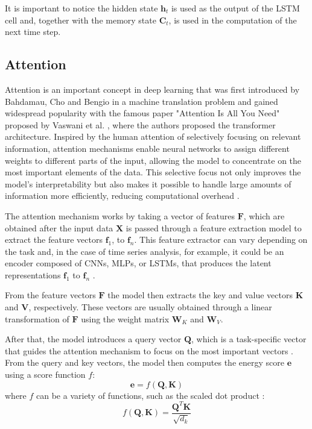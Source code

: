 It is important to notice the hidden state $\boldsymbol{h}_t$ is used as the output of the LSTM cell and, together with the memory state $\boldsymbol{C}_t$, is used in the computation of the next time step.

\subsection{Attention} \label{sec-attention}

Attention is an important concept in deep learning that was first introduced by Bahdamau, Cho and Bengio \cite{bahdanau2016neuralmachinetranslationjointly} in a machine translation problem and gained widespread popularity with the famous paper "Attention Is All You Need" proposed by Vaswani et al. \cite{vaswani2023attentionneed}, where the authors proposed the transformer architecture. Inspired by the human attention of selectively focusing on relevant information, attention mechanisms enable neural networks to assign different weights to different parts of the input, allowing the model to concentrate on the most important elements of the data. This selective focus not only improves the model's interpretability but also makes it possible to handle large amounts of information more efficiently, reducing computational overhead \cite{NIU202148}.

The attention mechanism works by taking a vector of features $\boldsymbol{F}$, which are obtained after the input data $\boldsymbol{X}$ is passed through a feature extraction model to extract the feature vectors $\boldsymbol{f}_1$, to $\boldsymbol{f}_n$. This feature extractor can vary depending on the task and, in the case of time series analysis, for example, it could be an encoder composed of CNNs, MLPs, or LSTMs, that produces the latent representations $\boldsymbol{f}_1$ to $\boldsymbol{f}_n$ \cite{Brauwers_2023}.

From the feature vectors $\boldsymbol{F}$ the model then extracts the key and value vectors $\boldsymbol{K}$ and $\boldsymbol{V}$, respectively. These vectors are usually obtained through a linear transformation of $\boldsymbol{F}$ using the weight matrix $\boldsymbol{W}_K$ and $\boldsymbol{W}_V$.

After that, the model introduces a query vector $\boldsymbol{Q}$, which is a task-specific vector that guides the attention mechanism to focus on the most important vectors \cite{Brauwers_2023,NIU202148}. From the query and key vectors, the model then computes the energy score $\boldsymbol{e}$ using a score function $f$:
\begin{equation}
    \boldsymbol{e} = f\left(\boldsymbol{Q},\boldsymbol{K}\right)
\end{equation}
where $f$ can be a variety of functions, such as the scaled dot product \cite{vaswani2023attentionneed}:
\begin{equation}
    f\left(\boldsymbol{Q},\boldsymbol{K}\right) = \frac{\boldsymbol{Q}^T \boldsymbol{K}}{\sqrt{d_k}}
\end{equation}

